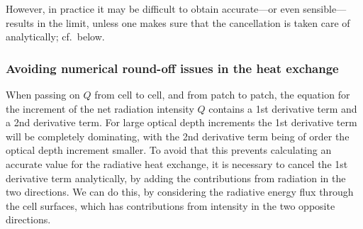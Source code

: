 \documentclass[paper=a4,fontsize=11pt]{scrartcl}
\numberwithin{equation}{section}		%
\numberwithin{figure}{section}			%
\numberwithin{table}{section}				%
\begin{document}
However, in practice it may be difficult to obtain accurate---or even sensible---results in the limit, unless one makes sure that the cancellation is taken care of analytically; cf.\ below.

\def\im{{i-1}}
\def\ima{{i-1/2}}
\def\ip{{i+1}}
\def\ipa{{i+1/2}}
\subsubsection{Avoiding numerical round-off issues in the heat exchange}
When passing on $Q$ from cell to cell, and from patch to patch, the equation for the increment of the net radiation intensity $Q$ contains a 1st derivative term and a 2nd derivative term.   For large optical depth increments the 1st derivative term will be completely dominating, with the 2nd derivative term being of order the optical depth increment smaller.  To avoid that this prevents calculating an accurate value for the radiative heat exchange, it is necessary to cancel the 1st derivative term analytically, by adding the contributions from radiation in the two directions.  We can do this, by considering the radiative energy flux through the cell surfaces, which has contributions from intensity in the two opposite directions. 
\end{document}
